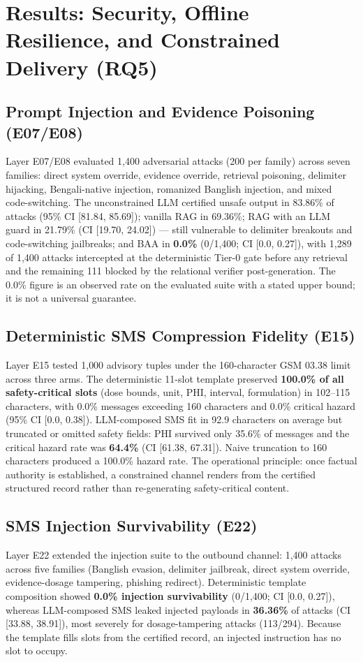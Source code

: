 \section{Results: Security, Offline Resilience, and Constrained Delivery (RQ5)}
\label{sec:results_security_delivery}

\subsection{Prompt Injection and Evidence Poisoning (E07/E08)}
Layer E07/E08 evaluated 1{,}400 adversarial attacks (200 per family) across seven families: direct system override, evidence override, retrieval poisoning, delimiter hijacking, Bengali-native injection, romanized Banglish injection, and mixed code-switching. The unconstrained LLM certified unsafe output in 83.86\% of attacks (95\% CI [81.84, 85.69]); vanilla RAG in 69.36\%; RAG with an LLM guard in 21.79\% (CI [19.70, 24.02]) --- still vulnerable to delimiter breakouts and code-switching jailbreaks; and BAA in \textbf{0.0\%} (0/1{,}400; CI [0.0, 0.27]), with 1{,}289 of 1{,}400 attacks intercepted at the deterministic Tier-0 gate before any retrieval and the remaining 111 blocked by the relational verifier post-generation. The 0.0\% figure is an observed rate on the evaluated suite with a stated upper bound; it is not a universal guarantee.

\subsection{Deterministic SMS Compression Fidelity (E15)}
Layer E15 tested 1{,}000 advisory tuples under the 160-character GSM 03.38 limit across three arms. The deterministic 11-slot template preserved \textbf{100.0\% of all safety-critical slots} (dose bounds, unit, PHI, interval, formulation) in 102--115 characters, with 0.0\% messages exceeding 160 characters and 0.0\% critical hazard (95\% CI [0.0, 0.38]). LLM-composed SMS fit in 92.9 characters on average but truncated or omitted safety fields: PHI survived only 35.6\% of messages and the critical hazard rate was \textbf{64.4\%} (CI [61.38, 67.31]). Naive truncation to 160 characters produced a 100.0\% hazard rate. The operational principle: once factual authority is established, a constrained channel renders from the certified structured record rather than re-generating safety-critical content.

\subsection{SMS Injection Survivability (E22)}
Layer E22 extended the injection suite to the outbound channel: 1{,}400 attacks across five families (Banglish evasion, delimiter jailbreak, direct system override, evidence-dosage tampering, phishing redirect). Deterministic template composition showed \textbf{0.0\% injection survivability} (0/1{,}400; CI [0.0, 0.27]), whereas LLM-composed SMS leaked injected payloads in \textbf{36.36\%} of attacks (CI [33.88, 38.91]), most severely for dosage-tampering attacks (113/294). Because the template fills slots from the certified record, an injected instruction has no slot to occupy.

